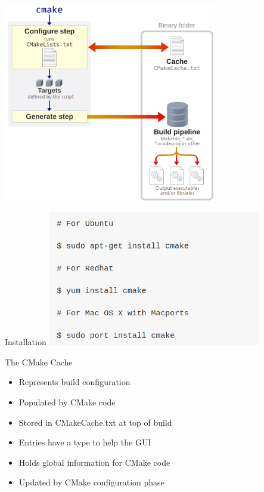 \documentclass[xcolor=x11names,compress]{beamer}
\renewcommand{\(}{\begin{columns}}
\renewcommand{\)}{\end{columns}}
\newcommand{\<}[1]{\begin{column}{#1}}
\renewcommand{\>}{\end{column}}
\begin{document}
\begin{frame}
	\includegraphics[width = 0.7\textwidth,height = 0.7\textheight]{s13.png}
\end{frame}
\begin{frame}{Installation}
	\includegraphics[width = 0.7\textwidth,height = 0.4\textheight]{s14.png}
	\end{frame}			
\begin{frame}{The CMake Cache}
\begin{itemize}
\item Represents build configuration
\item Populated by CMake code
\item Stored in CMakeCache.txt at top of build
\item Entries have a type to help the GUI
\item Holds global information for CMake code
\item Updated by CMake configuration phase
	\end{itemize}
\end{frame}
\end{document}
